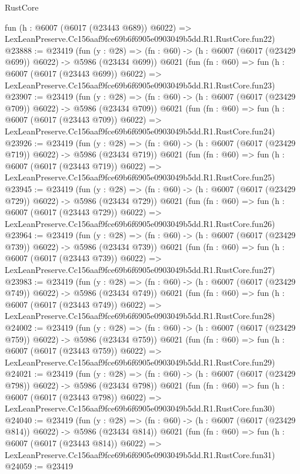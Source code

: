 \begin{lexlean}{RustCore}
\begin{coremodule}
    fun (h : @6007 (@6017 (@23443 @689)) @6022) =>
    LexLeanPreserve.Cc156aaf9fce69b6f6905e0903049b5dd.R1.RustCore.fun22)
@23888 := @23419
    (fun (y : @28) => (fn : @60) -> (h : @6007 (@6017 (@23429 @699)) @6022) -> @5986 (@23434 @699))
    @6021
    (fun (fn : @60) =>
    fun (h : @6007 (@6017 (@23443 @699)) @6022) =>
    LexLeanPreserve.Cc156aaf9fce69b6f6905e0903049b5dd.R1.RustCore.fun23)
@23907 := @23419
    (fun (y : @28) => (fn : @60) -> (h : @6007 (@6017 (@23429 @709)) @6022) -> @5986 (@23434 @709))
    @6021
    (fun (fn : @60) =>
    fun (h : @6007 (@6017 (@23443 @709)) @6022) =>
    LexLeanPreserve.Cc156aaf9fce69b6f6905e0903049b5dd.R1.RustCore.fun24)
@23926 := @23419
    (fun (y : @28) => (fn : @60) -> (h : @6007 (@6017 (@23429 @719)) @6022) -> @5986 (@23434 @719))
    @6021
    (fun (fn : @60) =>
    fun (h : @6007 (@6017 (@23443 @719)) @6022) =>
    LexLeanPreserve.Cc156aaf9fce69b6f6905e0903049b5dd.R1.RustCore.fun25)
@23945 := @23419
    (fun (y : @28) => (fn : @60) -> (h : @6007 (@6017 (@23429 @729)) @6022) -> @5986 (@23434 @729))
    @6021
    (fun (fn : @60) =>
    fun (h : @6007 (@6017 (@23443 @729)) @6022) =>
    LexLeanPreserve.Cc156aaf9fce69b6f6905e0903049b5dd.R1.RustCore.fun26)
@23964 := @23419
    (fun (y : @28) => (fn : @60) -> (h : @6007 (@6017 (@23429 @739)) @6022) -> @5986 (@23434 @739))
    @6021
    (fun (fn : @60) =>
    fun (h : @6007 (@6017 (@23443 @739)) @6022) =>
    LexLeanPreserve.Cc156aaf9fce69b6f6905e0903049b5dd.R1.RustCore.fun27)
@23983 := @23419
    (fun (y : @28) => (fn : @60) -> (h : @6007 (@6017 (@23429 @749)) @6022) -> @5986 (@23434 @749))
    @6021
    (fun (fn : @60) =>
    fun (h : @6007 (@6017 (@23443 @749)) @6022) =>
    LexLeanPreserve.Cc156aaf9fce69b6f6905e0903049b5dd.R1.RustCore.fun28)
@24002 := @23419
    (fun (y : @28) => (fn : @60) -> (h : @6007 (@6017 (@23429 @759)) @6022) -> @5986 (@23434 @759))
    @6021
    (fun (fn : @60) =>
    fun (h : @6007 (@6017 (@23443 @759)) @6022) =>
    LexLeanPreserve.Cc156aaf9fce69b6f6905e0903049b5dd.R1.RustCore.fun29)
@24021 := @23419
    (fun (y : @28) => (fn : @60) -> (h : @6007 (@6017 (@23429 @798)) @6022) -> @5986 (@23434 @798))
    @6021
    (fun (fn : @60) =>
    fun (h : @6007 (@6017 (@23443 @798)) @6022) =>
    LexLeanPreserve.Cc156aaf9fce69b6f6905e0903049b5dd.R1.RustCore.fun30)
@24040 := @23419
    (fun (y : @28) => (fn : @60) -> (h : @6007 (@6017 (@23429 @814)) @6022) -> @5986 (@23434 @814))
    @6021
    (fun (fn : @60) =>
    fun (h : @6007 (@6017 (@23443 @814)) @6022) =>
    LexLeanPreserve.Cc156aaf9fce69b6f6905e0903049b5dd.R1.RustCore.fun31)
@24059 := @23419

\end{coremodule}
\end{lexlean}
